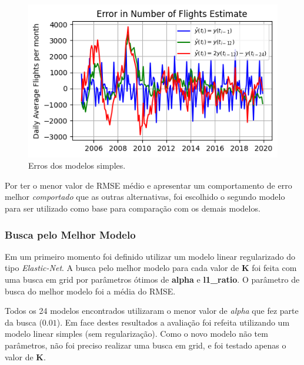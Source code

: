 \documentclass[final,5p]{elsarticle}
\numberwithin{equation}{section}
\begin{document}
        \begin{figure}[hbt!]
            \includegraphics[width=0.95\columnwidth]{B1_NaiveErrors.png}
            \caption{Erros dos modelos simples.}
            \label{fig:naive_erros}
        \end{figure}

    Por ter o menor valor de RMSE médio e apresentar um comportamento de erro melhor \emph{comportado} que as outras alternativas, foi escolhido o segundo modelo para ser utilizado como base para comparação com os demais modelos.

    \subsubsection{Busca pelo Melhor Modelo}

    Em um primeiro momento foi definido utilizar um modelo linear regularizado do tipo \emph{Elastic-Net}. A busca pelo melhor modelo para cada valor de \textbf{K} foi feita com uma busca em grid por parâmetros ótimos de \textbf{alpha} e \textbf{l1\_ratio}. O parâmetro de busca do melhor modelo foi a média do RMSE.

    Todos os 24 modelos encontrados utilizaram o menor valor de \emph{alpha} que fez parte da busca ($0.01$). Em face destes resultados a avaliação foi refeita utilizando um modelo linear simples (sem regularização). Como o novo modelo não tem parâmetros, não foi preciso realizar uma busca em grid, e foi testado apenas o valor de \textbf{K}.
\end{document}
